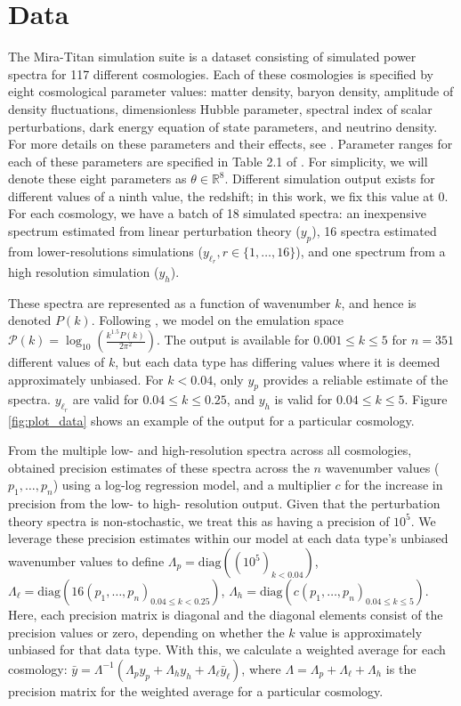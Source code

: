 \documentclass[11pt]{article}
\begin{document}
\section{Data}
\label{sec:data}

The Mira-Titan simulation suite is a dataset consisting of simulated power spectra for 
117 different cosmologies. Each of these cosmologies is specified by eight cosmological 
parameter values: matter density, baryon density, amplitude of density fluctuations, 
dimensionless Hubble parameter, spectral index of scalar perturbations,
dark energy equation of state parameters, and neutrino density. For more details 
on these parameters and their effects, see \cite{dodelson2020modern, aghanim2020planck, heitmann2016mira}. 
Parameter ranges for each of these parameters are specified in Table 2.1 of \cite{moran2023mira}.
For simplicity, we will denote these eight parameters as $\theta \in \mathbb{R}^8$. Different simulation 
output exists for different values of a ninth value, the redshift; in this work, we fix 
this value at 0. For each cosmology, we have a batch of 18 simulated spectra: an inexpensive 
spectrum estimated from linear perturbation theory ($y_p$), 16 spectra estimated from 
lower-resolutions simulations ($y_{\ell_r}, r \in \{1,\dots,16\}$), and one spectrum from 
a high resolution simulation ($y_h$). 

These spectra are represented as a function of wavenumber $k$, and hence is denoted $P(k)$. 
Following \cite{moran2023mira}, we model on the emulation space 
$\mathcal{P}(k)=\log_{10}\left(\frac{k^{1.5}P(k)}{2\pi^2}\right)$. The output is available 
for $0.001 \leq k \leq 5$ for $n=351$ different values of $k$, but each data type has differing 
values where it is deemed approximately unbiased. For $k<0.04$, only $y_p$ provides a reliable 
estimate of the spectra. $y_{\ell_r}$ are valid for $0.04 \leq k \leq 0.25$, and $y_h$ is valid 
for $0.04 \leq k \leq 5$. Figure \ref{fig:plot_data} shows an example of the output for a 
particular cosmology.

From the multiple low- and high-resolution spectra across all cosmologies, 
\cite{moran2023mira} obtained precision estimates of these spectra across the $n$ 
wavenumber values ($p_1,\dots,p_n$) using a log-log regression model, and a multiplier 
$c$ for the increase in precision from the low- to high- resolution output. Given 
that the perturbation theory spectra is non-stochastic, we treat this as having a 
precision of $10^5$. We leverage these precision estimates within our model at each 
data type's unbiased wavenumber values to define 
$\Lambda_p = \text{diag}\left((10^5)_{k < 0.04}\right)$, 
$\Lambda_{\ell} = \text{diag}\left(16(p_1,\dots,p_n)_{0.04 \leq k < 0.25}\right)$, 
$\Lambda_h = \text{diag}\left(c(p_1,\dots,p_n)_{0.04 \leq k \leq 5}\right)$. 
Here, each precision matrix is diagonal and the diagonal elements consist of the 
precision values or zero, depending on whether the $k$ value is approximately unbiased 
for that data type. With this, we calculate a weighted average for each cosmology: 
$\bar y = \Lambda^{-1}(\Lambda_p y_p + \Lambda_h y_h + \Lambda_{\ell} \bar{y}_\ell)$, 
where $\Lambda = \Lambda_p + \Lambda_\ell + \Lambda_h$ is the precision matrix for 
the weighted average for a particular cosmology.
\end{document}
